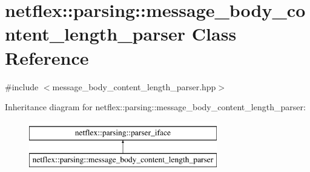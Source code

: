 \hypertarget{classnetflex_1_1parsing_1_1message__body__content__length__parser}{}\section{netflex\+:\+:parsing\+:\+:message\+\_\+body\+\_\+content\+\_\+length\+\_\+parser Class Reference}
\label{classnetflex_1_1parsing_1_1message__body__content__length__parser}


{\ttfamily \#include $<$message\+\_\+body\+\_\+content\+\_\+length\+\_\+parser.\+hpp$>$}

Inheritance diagram for netflex\+:\+:parsing\+:\+:message\+\_\+body\+\_\+content\+\_\+length\+\_\+parser\+:\begin{figure}[H]
\begin{center}
\leavevmode
\includegraphics[height=2.000000cm]{classnetflex_1_1parsing_1_1message__body__content__length__parser}
\end{center}
\end{figure}
